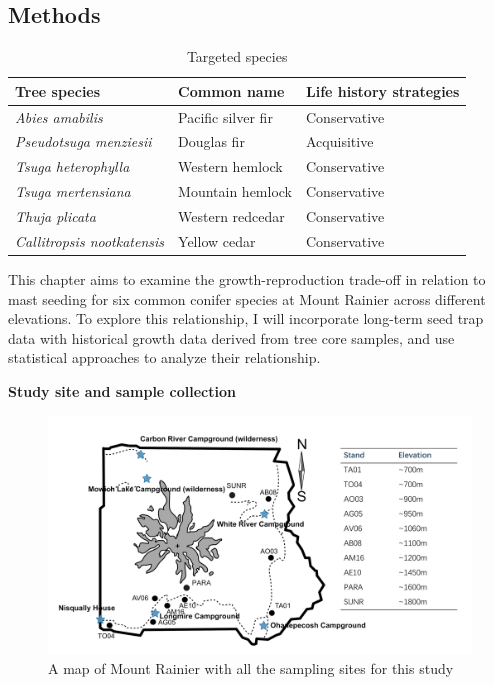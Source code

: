 \documentclass[11pt,letter]{article}
\begin{document}
\subsection{Methods}
\begin{table}[htb]
	\centering
	\small
	\caption{Targeted species}
\begin{tabular}{|p{5cm}|p{5cm}|p{5cm}|}
\hline
 Tree species & Common name & Life history strategies\\ \hline %
\textit{Abies amabilis} & Pacific silver fir & Conservative \\ \hline
\textit{Pseudotsuga menziesii} & Douglas fir & Acquisitive    \\\hline
\textit{Tsuga heterophylla} & Western hemlock & Conservative    \\\hline
\textit{Tsuga mertensiana} & Mountain hemlock & Conservative    \\\hline
\textit{Thuja plicata} & Western redcedar & Conservative    \\\hline
\textit{Callitropsis nootkatensis} & Yellow cedar & Conservative    \\\hline
\end{tabular}
\end{table}
This chapter aims to examine the growth-reproduction trade-off in relation to mast seeding for six common conifer species at Mount Rainier across different elevations. To explore this relationship, I will incorporate long-term seed trap data with historical growth data derived from tree core samples, and use statistical approaches to analyze their relationship.\par
\textbf{Study site and sample collection}\\
\begin{figure}[htb]
	\centering
	\includegraphics[width=0.8\linewidth]{rainierMap.png}
	\caption{A map of Mount Rainier with all the sampling sites for this study}
	\label{fig:sites}
\end{figure}\\
\end{document}
